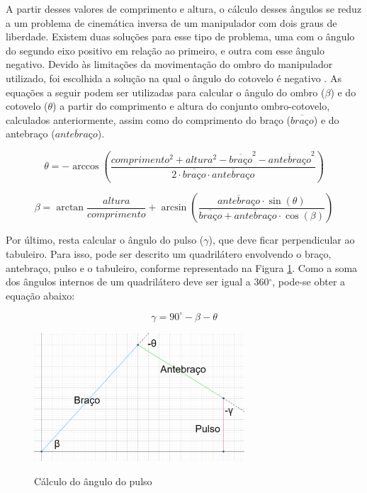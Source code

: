 A partir desses valores de comprimento e altura, o cálculo desses ângulos se reduz a um problema de cinemática inversa de um manipulador com dois graus de liberdade.
Existem duas soluções para esse tipo de problema, uma com o ângulo do segundo eixo positivo em relação ao primeiro, e outra com esse ângulo negativo.
Devido às limitações da movimentação do ombro do manipulador utilizado, foi escolhida a solução na qual o ângulo do cotovelo é negativo \cite{inverse_kinematics}.
As equações a seguir podem ser utilizadas para calcular o ângulo do ombro ($\beta$) e do cotovelo ($\theta$) a partir do comprimento e altura do conjunto ombro-cotovelo, calculados anteriormente,
assim como do comprimento do braço ($\overline{braço}$) e do antebraço ($\overline{antebraço}$).

\begin{dmath}
\label{eq:anguloCotovelo}
    \theta = -\arccos\left(\frac{comprimento^2 + altura^2 - \overline{braço}^2 - \overline{antebraço}^2}{2 \cdot \overline{braço} \cdot \overline{antebraço}}\right)
\end{dmath}

\begin{dmath}
\label{eq:anguloCotovelo}
    \beta = \arctan{\frac{altura}{comprimento}} + \arcsin\left(\frac{\overline{antebraço} \cdot \sin\left(\theta\right)}{\overline{braço} + \overline{antebraço} \cdot \cos\left(\beta\right)}\right)
\end{dmath}

Por último, resta calcular o ângulo do pulso ($\gamma$), que deve ficar perpendicular ao tabuleiro.
Para isso, pode ser descrito um quadrilátero envolvendo o braço, antebraço, pulso e o tabuleiro, conforme representado na Figura \ref{fig:calculoAnguloPulso}.
Como a soma dos ângulos internos de um quadrilátero deve ser igual a 360$^{\circ}$, pode-se obter a equação abaixo:

\begin{dmath}
\label{eq:anguloPulso}
        \gamma = 90^{\circ} - \beta - \theta
\end{dmath}

\begin{figure}[H]
    \centering
    \caption{Cálculo do ângulo do pulso}
    \includegraphics[keepaspectratio=true, width=0.7\textwidth]
    	{img/Cálculo ângulo pulso.png}
    \label{fig:calculoAnguloPulso}
\end{figure}

